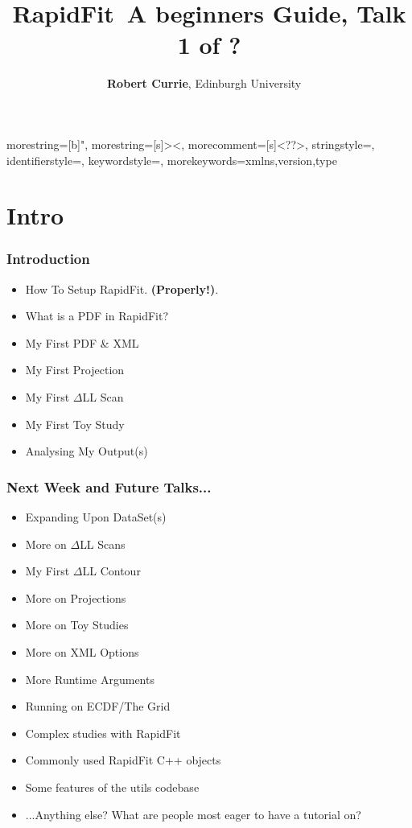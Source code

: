 \documentclass{beamer}
\title{\textbf{RapidFit}\newline~A beginners Guide, Talk 1 of ?}
\author{\textbf{Robert Currie}, Edinburgh University\newline\hspace{.5cm} \textcolor{white}{\textbf{\insertframenumber \vspace{-.33cm}/ \vspace{-.33cm}\inserttotalframenumber}}}
\date{}
\begin{document}

{
  morestring=[b]",
  morestring=[s]{>}{<},
  morecomment=[s]{<?}{?>},
  stringstyle=\color{black},
  identifierstyle=\color{darkblue},
  keywordstyle=\color{cyan},
  morekeywords={xmlns,version,type}%
}

\begin{frame}
\titlepage
\end{frame}

\section{Intro}

\begin{frame}
 \frametitle{Introduction}
 \begin{itemize}
  \item How To Setup RapidFit. \textbf{(Properly!)}.\newline
  \item What is a PDF in RapidFit?\newline
  \item My First PDF \& XML\newline
  \item My First Projection\newline
  \item My First $\Delta$LL Scan\newline
  \item My First Toy Study\newline
  \item Analysing My Output(s)\newline
  \end{itemize}
\end{frame}

\begin{frame}
\frametitle{Next Week and Future Talks...}
\begin{itemize}
\item Expanding Upon DataSet(s)
\item More on $\Delta$LL Scans
\item My First $\Delta$LL Contour
\item More on Projections
\item More on Toy Studies
\item More on XML Options
\item More Runtime Arguments
\item Running on ECDF/The Grid
\item Complex studies with RapidFit
\item Commonly used RapidFit C++ objects
\item Some features of the utils codebase
\item ...Anything else? What are people most eager to have a tutorial on?
\end{itemize}
\end{frame}
\end{document}
